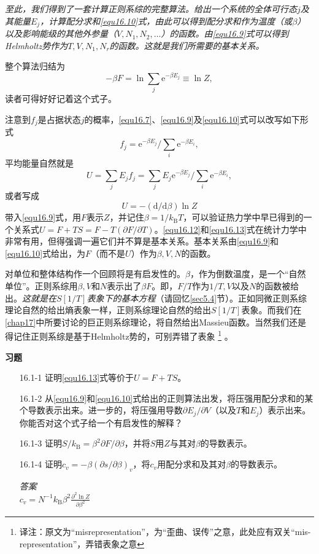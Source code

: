 {\it 至此，我们得到了一套计算正则系综的完整算法。给出一个系统的全体可行态$j$及其能量$E_j$，计算配分求和\ref{equ16.10}式，由此可以得到配分求和作为温度（或$\beta$）以及影响能级的其他外参量（$V,N_1,N_2,\dots$）的函数。由\eqref{equ16.9}式可以得到Helmholtz势作为$T,V,N_1,N_r$的函数。这就是我们所需要的基本关系。}

整个算法归结为
\begin{equation}
-\beta F = \ln \sum\limits_j \mathrm e^{-\beta E_j} \equiv \ln Z,
\end{equation}
读者可得好好记着这个式子。

注意到$f_j$是占据状态$j$的概率，\eqref{equ16.7}、\eqref{equ16.9}及\eqref{equ16.10}式可以改写如下形式
\begin{equation}
f_j  = {\mathrm e}^{-\beta E_j}/\sum\limits_i \mathrm e^{-\beta E_i},
\end{equation}
平均能量自然就是
\begin{equation}
U = \sum\limits_j E_jf_j = \sum\limits_j E_j{\mathrm e}^{-\beta E_j}/\sum\limits_i \mathrm e^{-\beta E_i},
\label{equ16.12}
\end{equation}
或者写成
\begin{equation}
U = -(\mathrm d/\mathrm d\beta)\ln Z
\label{equ16.13}
\end{equation}
带入\eqref{equ16.9}式，用$F$表示$Z$，并记住$\beta = 1/k_\text{B}T$，可以验证热力学中早已得到的一个关系式$U=F+TS=F-T(\partial F/\partial T)$。\eqref{equ16.12}和\eqref{equ16.13}式在统计力学中非常有用，但得强调一遍它们并不算是基本关系。基本关系由\eqref{equ16.9}和\eqref{equ16.10}式给出，为$F$（而不是$U$）作为$\beta,V,N$的函数。

对单位和整体结构作一个回顾将是有启发性的。$\beta$，作为倒数温度，是一个“自然单位”。正则系综用$\beta,V$和$N$表示出了$\beta F$。即，$F/T$作为$1/T,V$以及$N$的函数被给出。{\it 这就是在$S[1/T]$表象下的基本方程}（请回忆\ref{sec5.4}节）。正如同微正则系综理论自然的给出熵表象一样，正则系综理论自然的给出$S[1/T]$表象。而我们在\ref{chap17}中所要讨论的巨正则系综理论，将自然给出Massieu函数。当然我们还是得记住正则系综是基于Helmholtz势的，可别弄错了表象%
\footnote{译注：原文为``misrepresentation''，为“歪曲、误传”之意，此处应有双关``mis-representation''，弄错表象之意}%
。

{\noindent\bf 习题}
\begin{itemize}
\item[16.1-1] 证明\eqref{equ16.13}式等价于$U=F+TS$。
\item[16.1-2] 从\eqref{equ16.9}和\eqref{equ16.10}式给出的正则算法出发，将压强用配分求和的某个导数表示出来。进一步的，将压强用导数$\partial E_j/\partial V$（以及$T$和$E_j$）表示出来。你能否对这个式子给一个有启发性的解释？
\item[16.1-3] 证明$S/k_\text{B}=\beta^2\partial F/\partial\beta$，并将$S$用$Z$与其对$\beta$的导数表示。
\item[16.1-4] 证明$c_v=-\beta(\partial s/\partial\beta)_v$，将$c_v$用配分求和及其对$\beta$的导数表示。
\begin{flushleft}
{\it 答案}\\
$c_v=N^{-1}k_\text{B}\beta^2\frac{\partial^2\ln Z}{\partial \beta^2}$
\end{flushleft}
\end{itemize}
